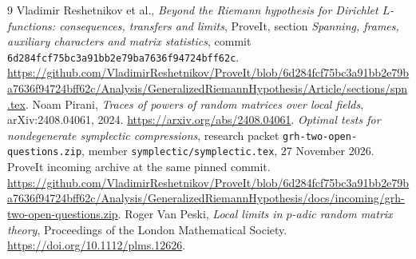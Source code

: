 \documentclass[11pt]{article}
\theoremstyle{remark}
\begin{document}
\begingroup
\small
\raggedright
\begin{thebibliography}{9}
\setlength{\itemsep}{2pt}
Vladimir Reshetnikov et al.,
\emph{Beyond the Riemann hypothesis for Dirichlet \(L\)-functions:
consequences, transfers and limits},
ProveIt, section \emph{Spanning, frames, auxiliary characters and matrix statistics},
commit \texttt{6d284fcf75bc3a91bb2e79ba7636f94724bff62c}.
\url{https://github.com/VladimirReshetnikov/ProveIt/blob/6d284fcf75bc3a91bb2e79ba7636f94724bff62c/Analysis/GeneralizedRiemannHypothesis/Article/sections/spn.tex}.
Noam Pirani,
\emph{Traces of powers of random matrices over local fields},
arXiv:2408.04061, 2024.
\url{https://arxiv.org/abs/2408.04061}.
\emph{Optimal tests for nondegenerate symplectic compressions},
research packet \texttt{grh-two-open-questions.zip},
member \texttt{symplectic/symplectic.tex}, 27 November 2026.
ProveIt incoming archive at the same pinned commit.
\url{https://github.com/VladimirReshetnikov/ProveIt/blob/6d284fcf75bc3a91bb2e79ba7636f94724bff62c/Analysis/GeneralizedRiemannHypothesis/docs/incoming/grh-two-open-questions.zip}.
Roger Van Peski,
\emph{Local limits in \(p\)-adic random matrix theory},
Proceedings of the London Mathematical Society.
\url{https://doi.org/10.1112/plms.12626}.
\end{thebibliography}
\endgroup
\end{document}
